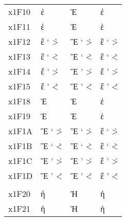 \documentclass[a4paper]{article}
\newcommand*{\Greek}{\foreignlanguage{greek}}
\newcommand*{\Greek}{\ensuregreek}
\newcommand*{\Cases}[1]{%
  & \Greek{#1} & \Greek{\MakeUppercase{#1}} & \Greek{\MakeLowercase{#1}}
}
\begin{document}
\begin{longtable}{llll}
                                                                                                                         \\
  x1F10 \Cases{ ἐ  \accpsili{\epsilon}                          \>{\epsilon}                                           } \\
  x1F11 \Cases{ ἑ  \accdasia{\epsilon}                          \<{\epsilon}                                           } \\
  x1F12 \Cases{ ἒ  \accpsilivaria{\epsilon}                     \>`{\epsilon}               \`>{\epsilon}              } \\
  x1F13 \Cases{ ἓ  \accdasiavaria{\epsilon}                     \<`{\epsilon}               \`<{\epsilon}              } \\
  x1F14 \Cases{ ἔ  \accpsilioxia{\epsilon}                      \>'{\epsilon}               \'>{\epsilon}              } \\
  x1F15 \Cases{ ἕ  \accdasiaoxia{\epsilon}                      \<'{\epsilon}               \'<{\epsilon}              } \\
  x1F18 \Cases{ Ἐ  \accpsili{\Epsilon}                          \>{\Epsilon}                                           } \\
  x1F19 \Cases{ Ἑ  \accdasia{\Epsilon}                          \<{\Epsilon}                                           } \\
  x1F1A \Cases{ Ἒ  \accpsilivaria{\Epsilon}                     \>`{\Epsilon}               \`>{\Epsilon}              } \\
  x1F1B \Cases{ Ἓ  \accdasiavaria{\Epsilon}                     \<`{\Epsilon}               \`<{\Epsilon}              } \\
  x1F1C \Cases{ Ἔ  \accpsilioxia{\Epsilon}                      \>'{\Epsilon}               \'>{\Epsilon}              } \\
  x1F1D \Cases{ Ἕ  \accdasiaoxia{\Epsilon}                      \<'{\Epsilon}               \'<{\Epsilon}              } \\
                                                                                                                         \\
  x1F20 \Cases{ ἠ  \accpsili{\eta}                              \>{\eta}                                               } \\
  x1F21 \Cases{ ἡ  \accdasia{\eta}                              \<{\eta}                                               } \\

\end{longtable}
\end{document}
